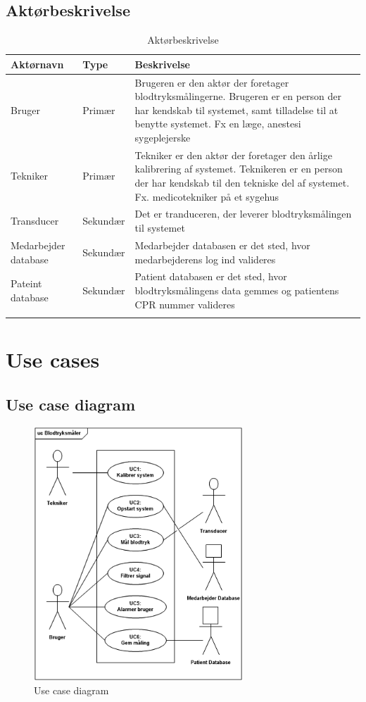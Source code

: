 \subsection{Aktørbeskrivelse}

\begin{longtabu}to 
	{\large \textbf{Aktørnavn}} & {\large \textbf{Type}} & {\large \textbf{Beskrivelse}}\\ \toprule
	Bruger & Primær & Brugeren er den aktør der foretager blodtryksmålingerne. Brugeren er en person der har kendskab til systemet, samt tilladelse til at benytte systemet. Fx en læge, anestesi sygeplejerske \\
	Tekniker & Primær & Tekniker er den aktør der foretager den årlige kalibrering af systemet. Teknikeren er en person der har kendskab til den tekniske del af systemet. Fx. medicotekniker på et sygehus\\
	Transducer & Sekundær & Det er tranduceren, der leverer blodtryksmålingen til systemet\\
	Medarbejder database & Sekundær & Medarbejder databasen er det sted, hvor medarbejderens log ind valideres \\
	Pateint database & Sekundær & Patient databasen er det sted, hvor blodtryksmålingens data gemmes og patientens CPR nummer valideres \\ \bottomrule
\caption{Aktørbeskrivelse}
\label{Aktoerbeskrivelse}
\end{longtabu}

\section{Use cases}
\subsection{Use case diagram}
\begin{figure}[H]
	\centering
	\includegraphics[width=0.7\textwidth]{Figurer/ISE/UcDiagram2}
	\caption{Use case diagram}
	\label{UC diagram}
\end{figure}

